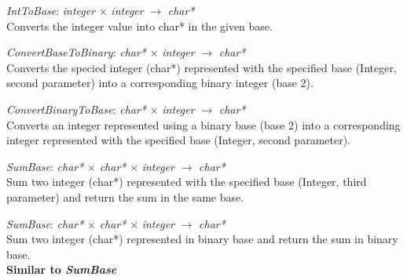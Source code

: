 \documentclass[book, backcover, english, nodocumentinfo]{upmethodology-document}
\begin{document}
		\begin{minipage}{\linewidth}
			\textit{IntToBase}: \textit{integer} $\times$ \textit{integer} $\rightarrow$ \textit{char*}\\
			Converts the integer value into char* in the given base.
			\label{algo:BNIL-IntToBase}
			
		\end{minipage}
		\nxtalgo{}

		\begin{minipage}{\linewidth}
			\textit{ConvertBaseToBinary}: \textit{char*} $\times$ \textit{integer} $\rightarrow$ \textit{char*}\\
			Converts the specied integer (char*) represented with the specified base (Integer, second parameter) into a corresponding binary integer (base 2).
			\label{algo:BNIL-ConvertBaseToBinary}
			
		\end{minipage}
		\nxtalgo{}

		\begin{minipage}{\linewidth}
			\textit{ConvertBinaryToBase}: \textit{char*} $\times$ \textit{integer} $\rightarrow$ \textit{char*}\\
			Converts an integer represented using a binary base (base 2) into a corresponding integer represented with the specified base (Integer, second parameter).
			\label{algo:BNIL-ConvertBinaryToBase}
			
		\end{minipage}
		\nxtalgo{}

		\begin{minipage}{\linewidth}
			\textit{SumBase}: \textit{char*} $\times$  \textit{char*} $\times$  \textit{integer} $\rightarrow$ \textit{char*}\\
			Sum two integer (char*) represented with the specified base (Integer, third parameter) and return the sum in the same base.
			\label{algo:BNIL-SumBase}
			
		\end{minipage}

		\begin{minipage}{\linewidth}
			\textit{SumBase}: \textit{char*} $\times$  \textit{char*} $\times$  \textit{integer} $\rightarrow$ \textit{char*}\\
			Sum two integer (char*) represented in binary base and return the sum in binary base.
			\label{algo:BNIL-SumBinary}\\
			\textbf{Similar to \textit{SumBase}}
		\end{minipage}
\end{document}

